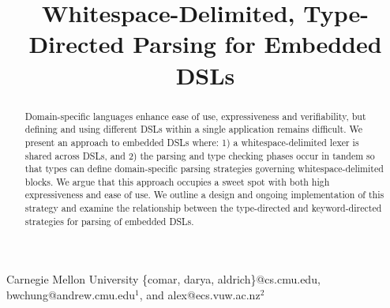\documentclass[english]{sigplanconf}
\begin{document}
\title{Whitespace-Delimited, Type-Directed Parsing for Embedded DSLs}

{Carnegie Mellon University}
{\{comar, darya, aldrich\}@cs.cmu.edu, bwchung@andrew.cmu.edu$^{1}$, and alex@ecs.vuw.ac.nz$^{2}$}
\maketitle

\begin{abstract}

Domain-specific languages enhance ease of use, expressiveness and
verifiability, 
but defining and using different 
DSLs within a single application remains difficult.  
We present an approach to embedded DSLs where:
1) a whitespace-delimited lexer is shared across DSLs, and 
2) the parsing and type checking phases occur in tandem so that types can define domain-specific parsing strategies governing whitespace-delimited blocks.
We argue that this approach occupies a sweet spot with both 
high expressiveness and ease of use. We outline a design
and ongoing implementation of this strategy
and examine the relationship between the type-directed and keyword-directed strategies for parsing of embedded DSLs.

\end{abstract}

\begin{sloppypar}









\end{sloppypar}



\end{document}
